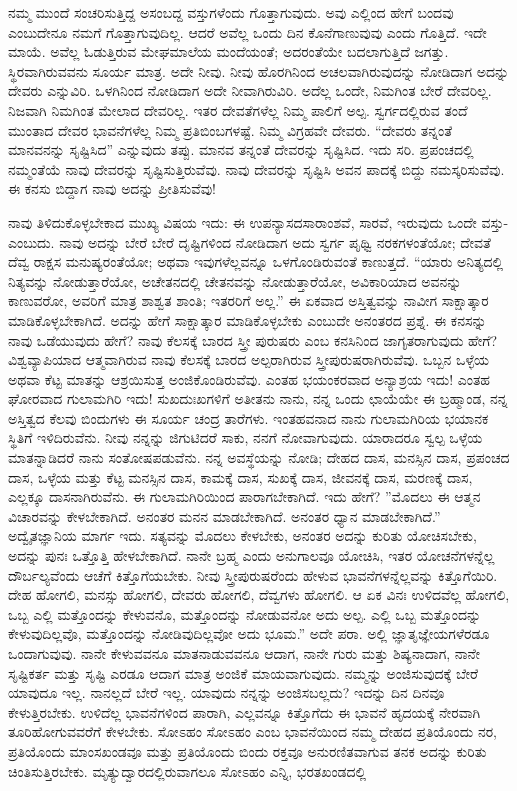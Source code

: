 ನಮ್ಮ ಮುಂದೆ ಸಂಚರಿಸುತ್ತಿದ್ದ ಅಸಂಬದ್ದ ವಸ್ತುಗಳೆಂದು ಗೊತ್ತಾಗುವುದು. ಅವು ಎಲ್ಲಿಂದ ಹೇಗೆ ಬಂದವು ಎಂಬುದೇನೂ ನಮಗೆ ಗೊತ್ತಾಗುವುದಿಲ್ಲ. ಆದರೆ ಅವೆಲ್ಲ ಒಂದು ದಿನ ಕೊನೆಗಾಣುವುವು ಎಂದು ಗೊತ್ತಿದೆ. ಇದೇ ಮಾಯೆ. ಅವೆಲ್ಲ ಓಡುತ್ತಿರುವ ಮೇಘಮಾಲೆಯ ಮಂದೆಯಂತೆ; ಅದರಂತೆಯೇ ಬದಲಾಗುತ್ತಿದೆ ಜಗತ್ತು. ಸ್ಥಿರವಾಗಿರುವವನು ಸೂರ್ಯ ಮಾತ್ರ. ಅದೇ ನೀವು. ನೀವು ಹೊರಗಿನಿಂದ ಅಚಲವಾಗಿರುವುದನ್ನು ನೋಡಿದಾಗ ಅದನ್ನು ದೇವರು ಎನ್ನುವಿರಿ. ಒಳಗಿನಿಂದ ನೋಡಿದಾಗ ಅದೇ ನೀವಾಗಿರುವಿರಿ. ಅದೆಲ್ಲ ಒಂದೇ, ನಿಮಗಿಂತ ಬೇರೆ ದೇವರಿಲ್ಲ. ನಿಜವಾಗಿ ನಿಮಗಿಂತ ಮೇಲಾದ ದೇವರಿಲ್ಲ. ಇತರ ದೇವತೆಗಳೆಲ್ಲ ನಿಮ್ಮ ಪಾಲಿಗೆ ಅಲ್ಪ. ಸ್ವರ್ಗದಲ್ಲಿರುವ ತಂದೆ ಮುಂತಾದ ದೇವರ ಭಾವನೆಗಳೆಲ್ಲ ನಿಮ್ಮ ಪ್ರತಿಬಿಂಬಗಳಷ್ಟೆ. ನಿಮ್ಮ ವಿಗ್ರಹವೇ ದೇವರು. “ದೇವರು ತನ್ನಂತೆ ಮಾನವನನ್ನು ಸೃಷ್ಟಿಸಿದ'' ಎನ್ನುವುದು ತಪ್ಪು. ಮಾನವ ತನ್ನಂತೆ ದೇವರನ್ನು ಸೃಷ್ಟಿಸಿದ. ಇದು ಸರಿ. ಪ್ರಪಂಚದಲ್ಲಿ ನಮ್ಮಂತೆಯೆ ನಾವು ದೇವರನ್ನು ಸೃಷ್ಟಿಸುತ್ತಿರುವೆವು. ನಾವು ದೇವರನ್ನು ಸೃಷ್ಟಿಸಿ ಅವನ ಪಾದಕ್ಕೆ ಬಿದ್ದು ನಮಸ್ಕರಿಸುವೆವು. ಈ ಕನಸು ಬಿದ್ದಾಗ ನಾವು ಅದನ್ನು ಪ್ರೀತಿಸುವೆವು!

ನಾವು ತಿಳಿದುಕೊಳ್ಳಬೇಕಾದ ಮುಖ್ಯ ವಿಷಯ ಇದು: ಈ ಉಪನ್ಯಾಸದ\break ಸಾರಾಂಶವೆ, ಸಾರವೆ, ಇರುವುದು ಒಂದೇ ವಸ್ತು-ಎಂಬುದು. ನಾವು ಅದನ್ನು ಬೇರೆ ಬೇರೆ ದೃಷ್ಟಿಗಳಿಂದ ನೋಡಿದಾಗ ಅದು ಸ್ವರ್ಗ ಪೃಥ್ವಿ ನರಕಗಳಂತೆಯೋ; ದೇವತೆ ದೆವ್ವ ರಾಕ್ಷಸ ಮನುಷ್ಯರಂತೆಯೋ; ಅಥವಾ ಇವುಗಳೆಲ್ಲವನ್ನೂ ಒಳಗೊಂಡಿರುವಂತೆ ಕಾಣುತ್ತದೆ. “ಯಾರು ಅನಿತ್ಯದಲ್ಲಿ ನಿತ್ಯವನ್ನು ನೋಡುತ್ತಾರೆಯೋ, ಅಚೇತನದಲ್ಲಿ ಚೇತನವನ್ನು ನೋಡುತ್ತಾರೆಯೋ, ಅವಿಕಾರಿಯಾದ ಅವನನ್ನು ಕಾಣುವರೋ, ಅವರಿಗೆ ಮಾತ್ರ ಶಾಶ್ವತ ಶಾಂತಿ; ಇತರರಿಗೆ ಅಲ್ಲ.” ಈ ಏಕವಾದ ಅಸ್ತಿತ್ವವನ್ನು ನಾವೀಗ ಸಾಕ್ಷಾತ್ಕಾರ ಮಾಡಿಕೊಳ್ಳಬೇಕಾಗಿದೆ. ಅದನ್ನು ಹೇಗೆ ಸಾಕ್ಷಾತ್ಕಾರ ಮಾಡಿಕೊಳ್ಳಬೇಕು ಎಂಬುದೇ ಅನಂತರದ ಪ್ರಶ್ನೆ. ಈ ಕನಸನ್ನು ನಾವು ಒಡೆಯುವುದು ಹೇಗೆ? ನಾವು ಕೆಲಸಕ್ಕೆ ಬಾರದ ಸ್ತ್ರೀ ಪುರುಷರು ಎಂಬ ಕನಸಿನಿಂದ ಜಾಗೃತರಾಗುವುದು ಹೇಗೆ? ವಿಶ್ವವ್ಯಾಪಿಯಾದ ಆತ್ಮವಾಗಿರುವ ನಾವು ಕೆಲಸಕ್ಕೆ ಬಾರದ ಅಲ್ಪರಾಗಿರುವ ಸ್ತ್ರೀಪುರುಷರಾಗಿರುವೆವು. ಒಬ್ಬನ ಒಳ್ಳೆಯ ಅಥವಾ ಕೆಟ್ಟ ಮಾತನ್ನು ಆಶ್ರಯಿಸುತ್ತ ಅಂಜಿಕೊಂಡಿರುವೆವು. ಎಂತಹ ಭಯಂಕರವಾದ ಅನ್ಯಾಶ್ರಯ ಇದು! ಎಂತಹ ಘೋರವಾದ ಗುಲಾಮಗಿರಿ ಇದು! ಸುಖದುಃಖಗಳಿಗೆ ಅತೀತನು ನಾನು, ನನ್ನ ಒಂದು ಛಾಯೆಯೇ ಈ ಬ್ರಹ್ಮಾಂಡ, ನನ್ನ ಅಸ್ತಿತ್ವದ ಕೆಲವು ಬಿಂದುಗಳು ಈ ಸೂರ್ಯ ಚಂದ್ರ ತಾರೆಗಳು. ಇಂತಹವನಾದ ನಾನು ಗುಲಾಮಗಿರಿಯ ಭಯಾನಕ ಸ್ಥಿತಿಗೆ ಇಳಿದಿರುವೆನು. ನೀವು ನನ್ನನ್ನು ಜಿಗುಟಿದರೆ ಸಾಕು, ನನಗೆ ನೋವಾಗುವುದು. ಯಾರಾದರೂ ಸ್ವಲ್ಪ ಒಳ್ಳೆಯ ಮಾತನ್ನಾಡಿದರೆ ನಾನು ಸಂತೋಷಪಡುವೆನು. ನನ್ನ ಅವಸ್ಥೆಯನ್ನು ನೋಡಿ; ದೇಹದ ದಾಸ, ಮನಸ್ಸಿನ ದಾಸ, ಪ್ರಪಂಚದ ದಾಸ, ಒಳ್ಳೆಯ ಮತ್ತು ಕೆಟ್ಟ ಮನಸ್ಸಿನ ದಾಸ, ಕಾಮಕ್ಕೆ ದಾಸ, ಸುಖಕ್ಕೆ ದಾಸ, ಜೀವನಕ್ಕೆ ದಾಸ, ಮರಣಕ್ಕೆ ದಾಸ, ಎಲ್ಲಕ್ಕೂ ದಾಸನಾಗಿರುವೆನು. ಈ ಗುಲಾಮಗಿರಿಯಿಂದ ಪಾರಾಗಬೇಕಾಗಿದೆ. ಇದು ಹೇಗೆ? ''ಮೊದಲು ಈ ಆತ್ಮನ ವಿಚಾರವನ್ನು ಕೇಳಬೇಕಾಗಿದೆ. ಅನಂತರ ಮನನ ಮಾಡಬೇಕಾಗಿದೆ. ಅನಂತರ ಧ್ಯಾನ ಮಾಡಬೇಕಾಗಿದೆ.'' ಅದ್ವೈತಜ್ಞಾನಿಯ ಮಾರ್ಗ ಇದು. ಸತ್ಯವನ್ನು ಮೊದಲು ಕೇಳಬೇಕು, ಅನಂತರ ಅದನ್ನು ಕುರಿತು ಯೋಚಿಸಬೇಕು, ಅದನ್ನು ಪುನಃ ಒತ್ತೊತ್ತಿ ಹೇಳಬೇಕಾಗಿದೆ. ನಾನೇ ಬ್ರಹ್ಮ ಎಂದು ಅನುಗಾಲವೂ ಯೋಚಿಸಿ, ಇತರ ಯೋಚನೆಗಳನ್ನೆಲ್ಲ ದೌರ್ಬಲ್ಯವೆಂದು ಆಚೆಗೆ ಕಿತ್ತೊಗೆಯಬೇಕು. ನೀವು ಸ್ತ್ರೀಪುರುಷರೆಂದು ಹೇಳುವ ಭಾವನೆಗಳನ್ನೆಲ್ಲವನ್ನು ಕಿತ್ತೊಗೆಯಿರಿ. ದೇಹ ಹೋಗಲಿ, ಮನಸ್ಸು ಹೋಗಲಿ, ದೇವರು ಹೋಗಲಿ, ದೆವ್ವಗಳು ಹೋಗಲಿ. ಆ ಏಕ ವಿನಃ ಉಳಿದವೆಲ್ಲ ಹೋಗಲಿ, ಒಬ್ಬ ಎಲ್ಲಿ ಮತ್ತೊಂದನ್ನು ಕೇಳುವನೊ, ಮತ್ತೊಂದನ್ನು ನೋಡುವನೋ ಅದು ಅಲ್ಪ. ಎಲ್ಲಿ ಒಬ್ಬ ಮತ್ತೊಂದನ್ನು ಕೇಳುವುದಿಲ್ಲವೊ, ಮತ್ತೊಂದನ್ನು ನೋಡಿವುದಿಲ್ಲವೋ ಅದು ಭೂಮ.” ಅದೇ ಪರಾ. ಅಲ್ಲಿ ಜ್ಞಾತೃಜ್ಞೇಯಗಳೆರಡೂ ಒಂದಾಗುವುವು. ನಾನೇ ಕೇಳುವವನೂ ಮಾತನಾಡುವವನೂ ಆದಾಗ, ನಾನೇ ಗುರು ಮತ್ತು ಶಿಷ್ಯನಾದಾಗ, ನಾನೇ ಸೃಷ್ಟಿಕರ್ತ ಮತ್ತು ಸೃಷ್ಟಿ ಎರಡೂ ಆದಾಗ ಮಾತ್ರ ಅಂಜಿಕೆ ಮಾಯವಾಗುವುದು. ನಮ್ಮನ್ನು ಅಂಜಿಸುವುದಕ್ಕೆ ಬೇರೆ ಯಾವುದೂ ಇಲ್ಲ. ನಾನಲ್ಲದೆ ಬೇರೆ ಇಲ್ಲ. ಯಾವುದು ನನ್ನನ್ನು ಅಂಜಿಸಬಲ್ಲದು? ಇದನ್ನು ದಿನ ದಿನವೂ ಕೇಳುತ್ತಿರಬೇಕು. ಉಳಿದೆಲ್ಲ ಭಾವನೆಗಳಿಂದ ಪಾರಾಗಿ, ಎಲ್ಲವನ್ನೂ ಕಿತ್ತೊಗೆದು ಈ ಭಾವನೆ ಹೃದಯಕ್ಕೆ ನೇರವಾಗಿ ತೂರಿಹೋಗುವವರೆಗೆ ಕೇಳಬೇಕು. ಸೋಽಹಂ ಸೋಽಹಂ ಎಂಬ ಭಾವನೆಯಿಂದ ನಮ್ಮ ದೇಹದ ಪ್ರತಿಯೊಂದು ನರ, ಪ್ರತಿಯೊಂದು ಮಾಂಸಖಂಡವೂ ಮತ್ತು ಪ್ರತಿಯೊಂದು ಬಿಂದು ರಕ್ತವೂ ಅನುರಣಿತವಾಗುವ ತನಕ ಅದನ್ನು ಕುರಿತು ಚಿಂತಿಸುತ್ತಿರಬೇಕು. ಮೃತ್ಯುದ್ವಾರದಲ್ಲಿರುವಾಗಲೂ ಸೋಽಹಂ ಎನ್ನಿ, ಭರತಖಂಡದಲ್ಲಿ 